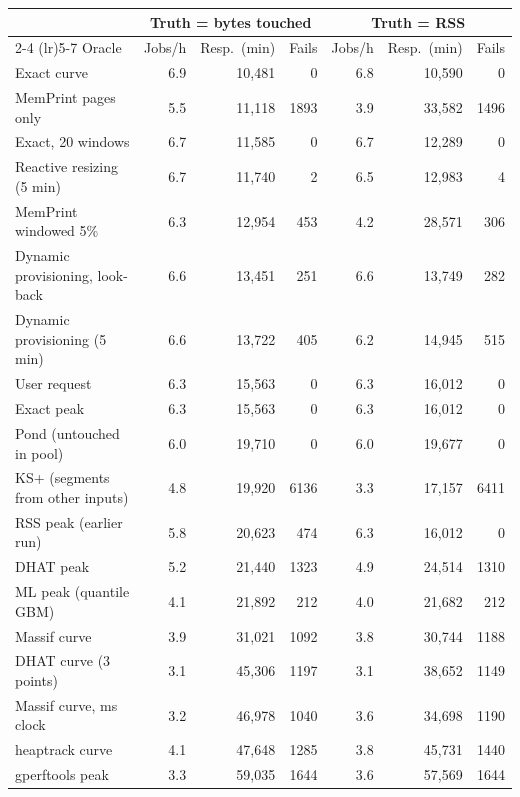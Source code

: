 \begin{tabular}{lrrrrrr}
\toprule
 & \multicolumn{3}{c}{Truth = bytes touched} & \multicolumn{3}{c}{Truth = RSS} \\
\cmidrule(lr){2-4} \cmidrule(lr){5-7}
Oracle & Jobs/h & Resp.\ (min) & Fails & Jobs/h & Resp.\ (min) & Fails \\
\midrule
Exact curve & 6.9 & 10{,}481 & 0 & 6.8 & 10{,}590 & 0 \\
MemPrint pages only & 5.5 & 11{,}118 & 1893 & 3.9 & 33{,}582 & 1496 \\
Exact, 20 windows & 6.7 & 11{,}585 & 0 & 6.7 & 12{,}289 & 0 \\
Reactive resizing (5 min) & 6.7 & 11{,}740 & 2 & 6.5 & 12{,}983 & 4 \\
MemPrint windowed 5\% & 6.3 & 12{,}954 & 453 & 4.2 & 28{,}571 & 306 \\
Dynamic provisioning, look-back & 6.6 & 13{,}451 & 251 & 6.6 & 13{,}749 & 282 \\
Dynamic provisioning (5 min) & 6.6 & 13{,}722 & 405 & 6.2 & 14{,}945 & 515 \\
User request & 6.3 & 15{,}563 & 0 & 6.3 & 16{,}012 & 0 \\
Exact peak & 6.3 & 15{,}563 & 0 & 6.3 & 16{,}012 & 0 \\
Pond (untouched in pool) & 6.0 & 19{,}710 & 0 & 6.0 & 19{,}677 & 0 \\
KS+ (segments from other inputs) & 4.8 & 19{,}920 & 6136 & 3.3 & 17{,}157 & 6411 \\
RSS peak (earlier run) & 5.8 & 20{,}623 & 474 & 6.3 & 16{,}012 & 0 \\
DHAT peak & 5.2 & 21{,}440 & 1323 & 4.9 & 24{,}514 & 1310 \\
ML peak (quantile GBM) & 4.1 & 21{,}892 & 212 & 4.0 & 21{,}682 & 212 \\
Massif curve & 3.9 & 31{,}021 & 1092 & 3.8 & 30{,}744 & 1188 \\
DHAT curve (3 points) & 3.1 & 45{,}306 & 1197 & 3.1 & 38{,}652 & 1149 \\
Massif curve, ms clock & 3.2 & 46{,}978 & 1040 & 3.6 & 34{,}698 & 1190 \\
heaptrack curve & 4.1 & 47{,}648 & 1285 & 3.8 & 45{,}731 & 1440 \\
gperftools peak & 3.3 & 59{,}035 & 1644 & 3.6 & 57{,}569 & 1644 \\
\bottomrule
\end{tabular}
